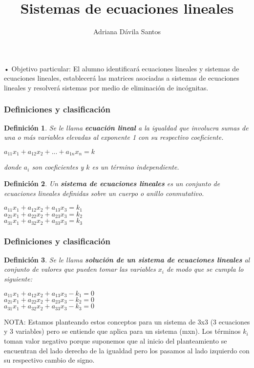 \documentclass[11pt]{beamer}
\author{Adriana Dávila Santos}
\title{Sistemas de ecuaciones lineales}
\newtheorem{defi}{Definición}
\begin{document}
\begin{frame}
\titlepage
\end{frame}


\begin{frame}{• Objetivo particular: }
El alumno identificará ecuaciones lineales y sistemas de ecuaciones lineales, establecerá las
matrices asociadas a sistemas de ecuaciones lineales y resolverá sistemas por medio de
eliminación de incógnitas.
\end{frame}

\begin{frame}
\frametitle{Definiciones y clasificación}
\begin{defi}
Se le llama \textbf{ecuación lineal} a la igualdad que involucra sumas de una o más variables elevadas al exponente 1 con su respectivo coeficiente.\\ 
\begin{center}
$a_{11}x_1 + a_{12}x_2 + ... + a_{1n}x_n = k$\\
\end{center}
donde $a_i$ son coeficientes y $k$ es un término independiente.  
\end{defi}
\begin{defi}
Un \textbf{sistema de ecuaciones lineales} es un conjunto de ecuaciones lineales definidas sobre un cuerpo o anillo conmutativo.\\
\begin{center}
$a_{11}x_1 + a_{12}x_2 + a_{13}x_3 = k_1$\\
$a_{21}x_1 + a_{22}x_2 + a_{23}x_3 = k_2$\\
$a_{31}x_1 + a_{32}x_2 + a_{33}x_3 = k_3$
\end{center}
\end{defi}
\end{frame}

\begin{frame}
\frametitle{Definiciones y clasificación}
\begin{defi}
Se le llama \textbf{solución de un sistema de ecuaciones lineales} al conjunto de valores que pueden tomar las variables $x_i$ de modo que se cumpla lo siguiente:\\
\begin{center}
$a_{11}x_1 + a_{12}x_2 + a_{13}x_3 - k_1 = 0$\\
$a_{21}x_1 + a_{22}x_2 + a_{23}x_3 - k_2 = 0$\\
$a_{31}x_1 + a_{32}x_2 + a_{33}x_3 - k_3 = 0$
\end{center}
\end{defi}
NOTA: Estamos planteando estos conceptos para un sistema de 3x3 (3 ecuaciones y 3 variables) pero se entiende que aplica para un sistema (mxn). Los términos $k_i$ toman valor negativo porque suponemos que al inicio del planteamiento se encuentran del lado derecho de la igualdad pero los pasamos al lado izquierdo con su respectivo cambio de signo. 
\end{frame}
\end{document}
